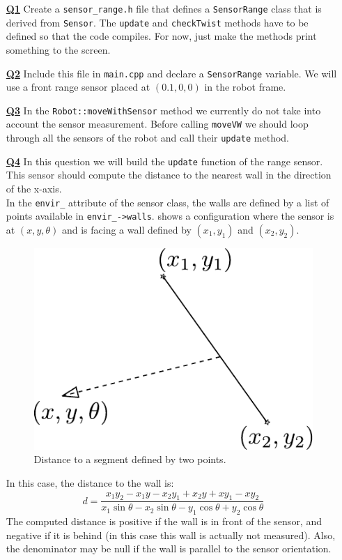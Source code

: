 \documentclass{ecnreport}
\begin{document}
\begin{itemize}
\medskip\item[\textbf{\underline{Q1}}] Create a \texttt{sensor\_range.h} file that defines a \texttt{SensorRange} class that is derived from \texttt{Sensor}. The \texttt{update} and \texttt{checkTwist} methods have to be defined so that the code compiles. For now, just make the methods print something to the screen.

\medskip\item[\textbf{\underline{Q2}}] Include this file in \texttt{main.cpp} and declare a \texttt{SensorRange} variable.  We will use a front range sensor placed at $(0.1, 0,0)$ in the robot frame.

\medskip\item[\textbf{\underline{Q3}}] In the \texttt{Robot::moveWithSensor} method we currently do not take into account the sensor measurement. 
Before calling \texttt{moveVW} we should loop through all the sensors of the robot and call their \texttt{update} method.

\medskip\item[\textbf{\underline{Q4}}] In this question we will build the \texttt{update} function of the range sensor.
This sensor should compute the distance to the nearest wall in the direction of the x-axis.\\

In the \texttt{envir\_} attribute of the sensor class, the walls are defined by a list of points available in \texttt{envir\_->walls}.  shows a configuration where the sensor is at $(x,y,\theta)$ and is facing a wall defined by $(x_1,y_1)$ and $(x_2,y_2)$.
\begin{figure}[h]\centering
\includegraphics[width=.3\linewidth]{sensor}
\caption{Distance to a segment defined by two points.}
\label{fig:dist}
\end{figure}
In this case, the distance to the wall is:
\begin{equation}
d = \frac{x_{1} y_{2} - x_{1} y - x_{2} y_{1} + x_{2} y + x y_{1} - x y_{2}}{x_{1} \sin\theta - x_{2} \sin\theta - y_{1} \cos\theta + y_{2} \cos\theta}
\end{equation}
The computed distance is positive if the wall is in front of the sensor, and negative if it is behind (in this case this wall is actually not measured). Also, the denominator may be null if the wall is parallel to the sensor orientation.


\end{itemize}
\end{document}
